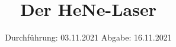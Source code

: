 

\subject{V61}
\title{Der HeNe-Laser}
\date{%
  Durchführung: 03.11.2021
  \hspace{3em}
  Abgabe: 16.11.2021
}



\maketitle
\thispagestyle{empty}
\tableofcontents
\newpage







\printbibliography{}


